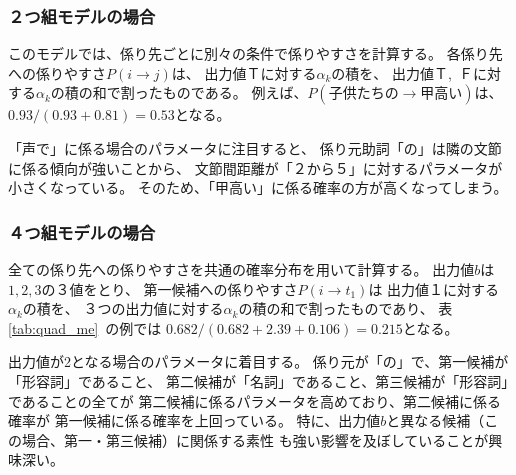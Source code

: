 \subsubsection{２つ組モデルの場合}

このモデルでは、係り先ごとに別々の条件で係りやすさを計算する。
各係り先への係りやすさ$P(i \rightarrow j)$は、
出力値Ｔに対する$\alpha_k$の積を、
出力値Ｔ,~Ｆに対する$\alpha_k$の積の和で割ったものである。
例えば、$P(子供たちの \rightarrow 甲高い)$は、
$0.93/(0.93+0.81)=0.53$となる。

「声で」に係る場合のパラメータに注目すると、
係り元助詞「の」は隣の文節に係る傾向が強いことから、
文節間距離が「２から５」に対するパラメータが小さくなっている。
そのため、「甲高い」に係る確率の方が高くなってしまう。

\subsubsection{４つ組モデルの場合}

全ての係り先への係りやすさを共通の確率分布を用いて計算する。
出力値$b$は$1,2,3$の３値をとり、
第一候補への係りやすさ$P(i \rightarrow t_1)$は
出力値１に対する$\alpha_k$の積を、
３つの出力値に対する$\alpha_k$の積の和で割ったものであり、
表\ref{tab:quad_me}~の例では
$0.682/(0.682+2.39+0.106)=0.215$となる。

出力値が2となる場合のパラメータに着目する。
係り元が「の」で、第一候補が「形容詞」であること、
第二候補が「名詞」であること、第三候補が「形容詞」であることの全てが
第二候補に係るパラメータを高めており、第二候補に係る確率が
第一候補に係る確率を上回っている。
特に、出力値$b$と異なる候補（この場合、第一・第三候補）に関係する素性
も強い影響を及ぼしていることが興味深い。

